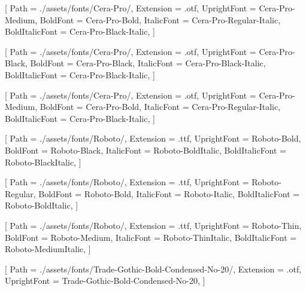 
\setmainfont{Cera-Pro-Medium}[
Path = ./assets/fonts/Cera-Pro/,
Extension = .otf,
UprightFont = Cera-Pro-Medium,
BoldFont = Cera-Pro-Bold,
ItalicFont = Cera-Pro-Regular-Italic,
BoldItalicFont = Cera-Pro-Black-Italic,
]


[
    Path = ./assets/fonts/Cera-Pro/,
    Extension = .otf,
    UprightFont = Cera-Pro-Black,
    BoldFont = Cera-Pro-Black,
    ItalicFont = Cera-Pro-Black-Italic,
    BoldItalicFont = Cera-Pro-Black-Italic,
]

[
    Path = ./assets/fonts/Cera-Pro/,
    Extension = .otf,
    UprightFont = Cera-Pro-Medium,
    BoldFont = Cera-Pro-Bold,
    ItalicFont = Cera-Pro-Regular-Italic,
    BoldItalicFont = Cera-Pro-Black-Italic,
]

[
    Path = ./assets/fonts/Roboto/,
    Extension = .ttf,
    UprightFont = Roboto-Bold,
    BoldFont = Roboto-Black,
    ItalicFont = Roboto-BoldItalic,
    BoldItalicFont = Roboto-BlackItalic,
]

[
    Path = ./assets/fonts/Roboto/,
    Extension = .ttf,
    UprightFont = Roboto-Regular,
    BoldFont = Roboto-Bold,
    ItalicFont = Roboto-Italic,
    BoldItalicFont = Roboto-BoldItalic,
]

[
    Path = ./assets/fonts/Roboto/,
    Extension = .ttf,
    UprightFont = Roboto-Thin,
    BoldFont = Roboto-Medium,
    ItalicFont = Roboto-ThinItalic,
    BoldItalicFont = Roboto-MediumItalic,
]

[
    Path = ./assets/fonts/Trade-Gothic-Bold-Condensed-No-20/,
    Extension = .otf,
    UprightFont = Trade-Gothic-Bold-Condensed-No-20,
]